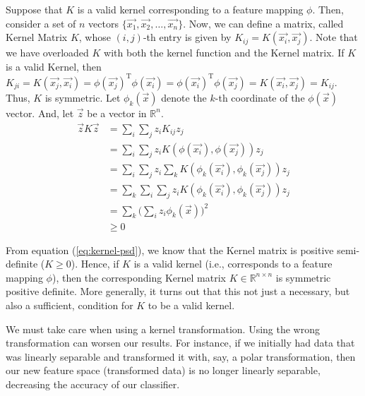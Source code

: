 Suppose that $K$ is a valid kernel corresponding to a feature mapping $\phi$. Then, consider a set of $n$ vectors $\{\vec{x_1}, \vec{x_2}, \dots, \vec{x_n}\}$. Now, we can define a matrix, called Kernel Matrix $K$, whose $(i,j)$-th entry is given by $K_{ij} = K(\vec{x_i}, \vec{x_j})$. Note that we have overloaded $K$ with both the kernel function and the Kernel matrix.
If $K$ is a valid Kernel, then $K_{ji} = K(\vec{x_j}, \vec{x_i}) = \phi(\vec{x_j})^{\text{T}}\phi(\vec{x_i}) = \phi(\vec{x_i})^{\text{T}}\phi(\vec{x_j}) = K(\vec{x_i}, \vec{x_j}) = K_{ij}$. Thus, $K$ is symmetric. Let $\phi_k(\vec{x})$ denote the $k$-th coordinate of the $\phi(\vec{x})$ vector. And, let $\vec{z}$ be a vector in $\mathbb{R}^n$.
\begin{align}
	\vec{z}K\vec{z} &= \sum_{i}\sum_{j} z_{i}K_{ij}z_{j} \nonumber \\
&= \sum_{i}\sum_{j} z_{i}K(\phi(\vec{x_i}), \phi(\vec{x_j}))z_{j} \nonumber \\
&= \sum_{i}\sum_{j} z_{i}\sum_{k} K(\phi_k(\vec{x_i}), \phi_k(\vec{x_j}))z_{j} \nonumber \\
&= \sum_{k}\sum_{i}\sum_{j} z_{i}K(\phi_k(\vec{x_i}), \phi_k(\vec{x_j}))z_{j} \nonumber \\
&= \sum_{k} \Bigg(\sum_{i} z_i\phi_{k}(\vec{x})\Bigg)^2 \nonumber \\
&\geq 0 \label{eq:kernel-psd}
\end{align}

From equation (\ref{eq:kernel-psd}), we know that the Kernel matrix is positive semi-definite ($K \geq 0$). Hence, if $K$ is a valid kernel (i.e., corresponds to a feature mapping $\phi$), then the corresponding Kernel matrix $K \in \mathbb{R}^{n\times n}$ is symmetric positive definite. More generally, it turns out that this not just a necessary, but also a sufficient, condition for $K$ to be a valid kernel\cite{svm-andrew-ng}.

We must take care when using a kernel transformation. Using the wrong transformation can worsen our results. For instance, if we initially had data that was linearly separable and transformed it with, say, a polar transformation, then our new feature space (transformed data) is no longer linearly separable, decreasing the accuracy of our classifier.